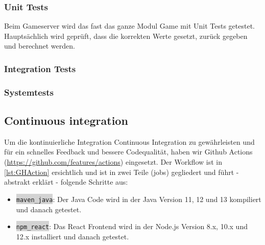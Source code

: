 \documentclass[11pt,ngerman]{article}
\newcommand{\inlinecode}[2]{\colorbox{lightgray}{\lstinline[language=#1]$#2$}}
\begin{document}
    \subsubsection{Unit Tests}
	Beim Gameserver wird das fast das ganze Modul Game mit Unit Tests getestet. Hauptsächlich wird geprüft, dass die korrekten Werte gesetzt, zurück gegeben und berechnet werden.

    \subsubsection{Integration Tests}

    \subsubsection{Systemtests}

    \subsection{Continuous integration}
    Um  die kontinuierliche Integration \Gls{Continuous Integration} zu gewährleisten und für ein schnelles Feedback und bessere Codequalität, haben wir Github Actions (\url{https://github.com/features/actions}) eingesetzt. Der Workflow ist in \autoref{lst:GHAction} ersichtlich  und ist in zwei Teile (jobs) gegliedert und führt - abstrakt erklärt - folgende Schritte aus:

    \begin{itemize}
        \item \inlinecode{bash}{maven_java}: Der Java Code wird in der Java Version 11, 12 und 13 kompiliert und danach getestet.
        \item \inlinecode{bash}{npm_react}: Das React Frontend wird in der Node.js Version 8.x, 10.x und 12.x installiert und danach getestet.
    \end{itemize}

    
    \vspace{.5cm}
\end{document}
